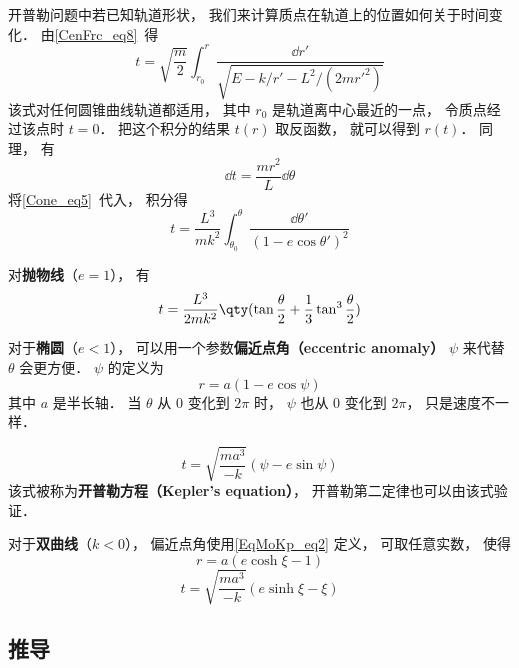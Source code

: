 

开普勒问题中若已知轨道形状， 我们来计算质点在轨道上的位置如何关于时间变化． 由\autoref{CenFrc_eq8}~得
\begin{equation}
t = \sqrt{\frac{m}{2}} \int_{r_0}^r \frac{\dd{r'}}{\sqrt{E - k/r' - L^2/(2mr'^2)}}
\end{equation}
该式对任何圆锥曲线轨道都适用， 其中 $r_0$ 是轨道离中心最近的一点， 令质点经过该点时 $t= 0$． 把这个积分的结果 $t(r)$ 取反函数， 就可以得到 $r(t)$． 同理， 有
\begin{equation}
\dd{t} = \frac{mr^2}{L}\dd{\theta}
\end{equation}
将\autoref{Cone_eq5}~代入， 积分得
\begin{equation}
t = \frac{L^3}{mk^2} \int_{\theta_0}^\theta \frac{\dd{\theta'}}{(1 - e\cos \theta')^2 }
\end{equation}

对\textbf{抛物线}（$e = 1$）， 有
\begin{equation}
t = \frac{L^3}{2mk^2} \qty(\tan\frac{\theta}{2} +  \frac{1}{3}\tan^3 \frac{\theta}{2})
\end{equation}

对于\textbf{椭圆}（$e < 1$）， 可以用一个参数\textbf{偏近点角（eccentric anomaly）} $\psi$ 来代替 $\theta$ 会更方便． $\psi$ 的定义为
\begin{equation}\label{EqMoKp_eq1}
r = a(1-e\cos\psi)
\end{equation}
其中 $a$ 是半长轴． 当 $\theta$ 从 $0$ 变化到 $2\pi$ 时， $\psi$ 也从 $0$ 变化到 $2\pi$， 只是速度不一样．

\begin{equation}
t = \sqrt{\frac{ma^3}{-k}} (\psi - e \sin\psi)
\end{equation}
该式被称为\textbf{开普勒方程（Kepler's equation）}， 开普勒第二定律也可以由该式验证．

对于\textbf{双曲线}（$k<0$）， 偏近点角使用\autoref{EqMoKp_eq2} 定义， 可取任意实数， 使得
\begin{equation}\label{EqMoKp_eq2} %
r = a(e\cosh\xi - 1)
\end{equation}
\begin{equation}
t = \sqrt{\frac{ma^3}{-k}} (e\sinh\xi - \xi)
\end{equation}



\subsection{推导}
